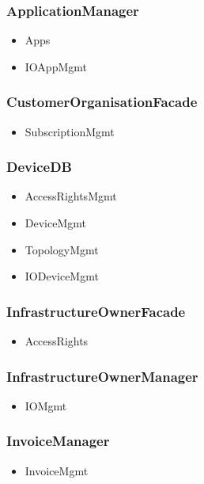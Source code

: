     \subsubsection{ApplicationManager}
        \begin{itemize}
            \item Apps
            \item IOAppMgmt
        \end{itemize}

    \subsubsection{CustomerOrganisationFacade}
        \begin{itemize}
            \item SubscriptionMgmt
        \end{itemize}

    \subsubsection{DeviceDB}
        \begin{itemize}
            \item AccessRightsMgmt
            \item DeviceMgmt
            \item TopologyMgmt
            \item IODeviceMgmt
        \end{itemize}

    \subsubsection{InfrastructureOwnerFacade}
        \begin{itemize}
            \item AccessRights
        \end{itemize}

    \subsubsection{InfrastructureOwnerManager}
        \begin{itemize}
            \item IOMgmt
        \end{itemize}

    \subsubsection{InvoiceManager}
        \begin{itemize}
            \item InvoiceMgmt
        \end{itemize}

